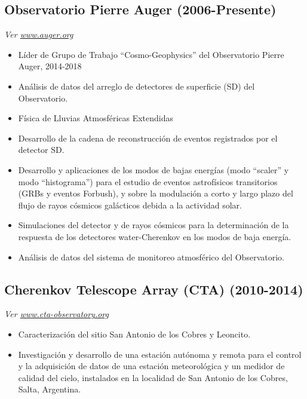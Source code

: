 \subsection*{Observatorio Pierre Auger (2006-Presente)}
{\small{\textit{Ver \href{http://www.auger.org/}{www.auger.org}}}}
\begin{itemize}
\item Líder de Grupo de Trabajo ``Cosmo-Geophysics'' del Observatorio Pierre Auger, 2014-2018
\item Análisis de datos del arreglo de detectores de superficie (SD) del Observatorio.
\item Física de Lluvias Atmosféricas Extendidas
\item Desarrollo de la cadena de reconstrucción de eventos registrados por el detector SD.
\item Desarrollo y aplicaciones de los modos de bajas energías (modo ``scaler'' y modo ``histograma'') para el estudio de eventos astrofísicos transitorios (GRBs y eventos Forbush), y sobre la modulación a corto y largo plazo del flujo de rayos cósmicos galácticos debida a la actividad solar.
\item Simulaciones del detector y de rayos cósmicos para la determinación de la respuesta de los detectores water-Cherenkov en los modos de baja energía.
\item Análisis de datos del sistema de monitoreo atmosférico del Observatorio.
\end{itemize}
\subsection*{Cherenkov Telescope Array (CTA) (2010-2014)}
{\small{\textit{Ver \href{http://www.cta-observatory.org}{www.cta-observatory.org}}}}
\begin{itemize}
\item Caracterización del sitio San Antonio de los Cobres y Leoncito. %
\item Investigación y desarrollo de una estación autónoma y remota para el control y la adquisición de datos de una estación meteorológica y un medidor de calidad del cielo, instalados en la localidad de San Antonio de los Cobres, Salta, Argentina.
\end{itemize}
\fi

